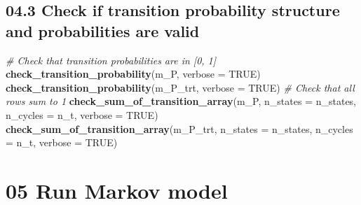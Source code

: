 \documentclass[
]{article}
\newenvironment{Shaded}{\begin{snugshade}}{\end{snugshade}}
\newcommand{\CommentTok}[1]{\textcolor[rgb]{0.56,0.35,0.01}{\textit{#1}}}
\newcommand{\ControlFlowTok}[1]{\textcolor[rgb]{0.13,0.29,0.53}{\textbf{#1}}}
\newcommand{\DataTypeTok}[1]{\textcolor[rgb]{0.13,0.29,0.53}{#1}}
\newcommand{\DecValTok}[1]{\textcolor[rgb]{0.00,0.00,0.81}{#1}}
\newcommand{\KeywordTok}[1]{\textcolor[rgb]{0.13,0.29,0.53}{\textbf{#1}}}
\newcommand{\NormalTok}[1]{#1}
\newcommand{\OperatorTok}[1]{\textcolor[rgb]{0.81,0.36,0.00}{\textbf{#1}}}
\newcommand{\OtherTok}[1]{\textcolor[rgb]{0.56,0.35,0.01}{#1}}
\newcommand{\StringTok}[1]{\textcolor[rgb]{0.31,0.60,0.02}{#1}}
\begin{document}
\hypertarget{check-if-transition-probability-structure-and-probabilities-are-valid}{%
\subsection{04.3 Check if transition probability structure and
probabilities are
valid}\label{check-if-transition-probability-structure-and-probabilities-are-valid}}

\begin{Shaded}
\begin{Highlighting}[]
\CommentTok{# Check that transition probabilities are in [0, 1]}
\KeywordTok{check_transition_probability}\NormalTok{(m_P, }\DataTypeTok{verbose =} \OtherTok{TRUE}\NormalTok{)}
\KeywordTok{check_transition_probability}\NormalTok{(m_P_trt, }\DataTypeTok{verbose =} \OtherTok{TRUE}\NormalTok{)}
\CommentTok{# Check that all rows sum to 1}
\KeywordTok{check_sum_of_transition_array}\NormalTok{(m_P, }\DataTypeTok{n_states =}\NormalTok{ n_states, }\DataTypeTok{n_cycles =}\NormalTok{ n_t, }\DataTypeTok{verbose =} \OtherTok{TRUE}\NormalTok{)}
\KeywordTok{check_sum_of_transition_array}\NormalTok{(m_P_trt, }\DataTypeTok{n_states =}\NormalTok{ n_states, }\DataTypeTok{n_cycles =}\NormalTok{ n_t, }\DataTypeTok{verbose =} \OtherTok{TRUE}\NormalTok{)}
\end{Highlighting}
\end{Shaded}

\hypertarget{run-markov-model}{%
\section{05 Run Markov model}\label{run-markov-model}}

\begin{Shaded}
\end{Shaded}
\end{document}
